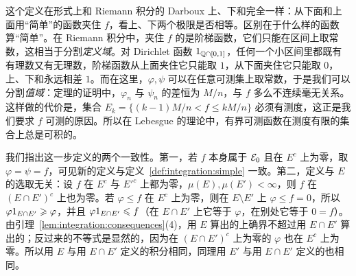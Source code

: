 \begin{remark}
这个定义在形式上和 Riemann 积分的 Darboux 上、下和完全一样：从下面和上面用“简单”的函数夹住 $f$，看上、下两个极限是否相等。区别在于什么样的函数算“简单”。在 Riemann 积分中，夹住 $f$ 的是阶梯函数，它们只能在区间上取常数，这相当于分割\emph{定义域}。对 Dirichlet 函数 $1_{\mathbb{Q}\cap[0,1]}$，任何一个小区间里都既有有理数又有无理数，阶梯函数从上面夹住它只能取 $1$，从下面夹住它只能取 $0$，上、下和永远相差 $1$。而在这里，$\varphi,\psi$ 可以在任意可测集上取常数，于是我们可以分割\emph{值域}：定理的证明中，$\varphi_n$ 与 $\psi_n$ 的差恒为 $M/n$，与 $f$ 多么不连续毫无关系。这样做的代价是，集合 $E_k=\{(k-1)M/n<f\leqslant kM/n\}$ 必须有测度，这正是我们要求 $f$ 可测的原因。所以在 Lebesgue 的理论中，有界可测函数在测度有限的集合上总是可积的。
\end{remark}

我们指出这一步定义的两个一致性。第一，若 $f$ 本身属于 $\mathcal{E}_0$ 且在 $E^c$ 上为零，取 $\varphi=\psi=f$，可见新的定义与定义~\ref{def:integration:simple} 一致。第二，定义与 $E$ 的选取无关：设 $f$ 在 $E^c$ 与 $E'^c$ 上都为零，$\mu(E),\mu(E')<\infty$，则 $f$ 在 $(E\cap E')^c$ 上也为零。若 $\varphi\leqslant f$ 在 $E^c$ 上为零，则在 $E\setminus E'$ 上 $\varphi\leqslant f=0$，所以 $\varphi1_{E\cap E'}\geqslant\varphi$，并且 $\varphi1_{E\cap E'}\leqslant f$（在 $E\cap E'$ 上它等于 $\varphi$，在别处它等于 $0=f$）。由引理~\ref{lem:integration:consequences}(4)，用 $E$ 算出的上确界不超过用 $E\cap E'$ 算出的；反过来的不等式是显然的，因为在 $(E\cap E')^c$ 上为零的 $\varphi$ 也在 $E^c$ 上为零。所以用 $E$ 与用 $E\cap E'$ 定义的积分相同，同理用 $E'$ 与用 $E\cap E'$ 定义的也相同。

